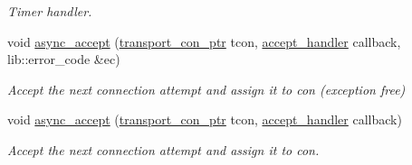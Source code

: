 \begin{DoxyCompactItemize}
\begin{DoxyCompactList}\small\item\em Timer handler. \end{DoxyCompactList}\item 
void \hyperlink{classwebsocketpp_1_1transport_1_1asio_1_1endpoint_ae24b2ea11e8ce90b6101c1ab56d7fe48}{async\+\_\+accept} (\hyperlink{classwebsocketpp_1_1transport_1_1asio_1_1endpoint_ac5fc306f32d15f92dd1b22366eaba62d}{transport\+\_\+con\+\_\+ptr} tcon, \hyperlink{namespacewebsocketpp_1_1transport_a9326ea831379368ee47841b2e46cb009}{accept\+\_\+handler} callback, lib\+::error\+\_\+code \&ec)
\begin{DoxyCompactList}\small\item\em Accept the next connection attempt and assign it to con (exception free) \end{DoxyCompactList}\item 
void \hyperlink{classwebsocketpp_1_1transport_1_1asio_1_1endpoint_a7e559e38bf344d60706f106db8b15d50}{async\+\_\+accept} (\hyperlink{classwebsocketpp_1_1transport_1_1asio_1_1endpoint_ac5fc306f32d15f92dd1b22366eaba62d}{transport\+\_\+con\+\_\+ptr} tcon, \hyperlink{namespacewebsocketpp_1_1transport_a9326ea831379368ee47841b2e46cb009}{accept\+\_\+handler} callback)
\begin{DoxyCompactList}\small\item\em Accept the next connection attempt and assign it to con. \end{DoxyCompactList}\end{DoxyCompactItemize}
